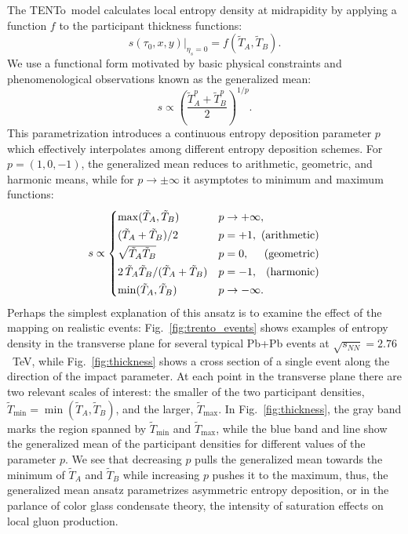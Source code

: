 \documentclass[aps,prc,reprint,amsmath,nofootinbib,noeprint]{revtex4-1}
\newcommand{\trento}{T\raisebox{-0.5ex}{R}ENTo}
\newcommand{\sqrts}{\sqrt{s_{NN}}}
\newcommand{\T}{\tilde{T}}
\begin{document}
The \trento\ model calculates local entropy density at midrapidity by applying a function $f$ to the participant thickness functions:
\begin{equation}
  s(\tau_0, x, y)\vert_{\eta_s=0} = f(\T_A, \T_B).
  \label{eq:mapping}
\end{equation}
We use a functional form motivated by basic physical constraints and phenomenological observations \cite{Moreland:2014oya} known as the generalized mean:
\begin{equation}
  s \propto \left( \frac{\T_A^p + \T_B^p}{2} \right)^{1/p}.
  \label{eq:genmean}
\end{equation}
This parametrization introduces a continuous entropy deposition parameter $p$ which effectively interpolates among different entropy deposition schemes.
For ${p=(1, 0, -1)}$, the generalized mean reduces to arithmetic, geometric, and harmonic means, while for ${p \rightarrow \pm\infty}$ it asymptotes to minimum and maximum functions:
\begin{equation}
  \newlength{\extraspace}
  \setlength{\extraspace}{0.5ex}
  s \propto
  \begin{cases}
    \max(\T_A, \T_B) & p \rightarrow +\infty, \\[\extraspace]
    (\T_A + \T_B)/2 & p = +1, \hfill \text{ (arithmetic)} \\[\extraspace]
    \sqrt{\T_A \T_B} & p = 0, \hfill \text{ (geometric)} \\[\extraspace]
    2\, \T_A \T_B/(\T_A + \T_B) & p = -1, \hfill \text{ (harmonic)} \\[\extraspace]
    \min(\T_A, \T_B) & p \rightarrow -\infty.
  \end{cases}
  \label{eq:means}
\end{equation}
Perhaps the simplest explanation of this ansatz is to examine the effect of the mapping on realistic events:
Fig.~\ref{fig:trento_events} shows examples of entropy density in the transverse plane for several typical Pb+Pb events at $\sqrts=2.76$~TeV,
while Fig.~\ref{fig:thickness} shows a cross section of a single event along the direction of the impact parameter.
At each point in the transverse plane there are two relevant scales of interest:
the smaller of the two participant densities, $\T_\text{min} = \min(\T_A, \T_B)$, and the larger, $\T_\text{max}$.
In Fig.~\ref{fig:thickness}, the gray band marks the region spanned by $\T_\text{min}$ and $\T_\text{max}$, while the blue band and line show the generalized mean of the participant densities for different values of the parameter $p$.
We see that decreasing $p$ pulls the generalized mean towards the minimum of $\T_A$ and $\T_B$ while increasing $p$ pushes it to the maximum, thus, the generalized mean ansatz parametrizes asymmetric entropy deposition, or in the parlance of color glass condensate theory, the intensity of saturation effects on local gluon production.
\end{document}
